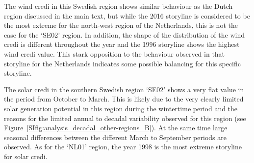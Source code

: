 \documentclass[a4paper,11pt]{extarticle}
\newcommand{\sdi}[0]{{\sc solar credi}}
\newcommand{\wdi}[0]{{\sc wind credi}}
\begin{document}
The \wdi{} in this Swedish region shows similar behaviour as the Dutch region discussed in the main text, but while the 2016 storyline is considered to be the most extreme for the north-west region of the Netherlands, this is not the case for the `SE02' region. 
In addition, the shape of the distribution of the \wdi{} is different throughout the year and the 1996 storyline shows the highest \wdi{} value. 
This stark opposition to the behaviour observed in that storyline for the Netherlands indicates some possible balancing for this specific storyline.

The \sdi{} in the southern Swedish region `SE02' shows a very flat value in the period from October to March. 
This is likely due to the very clearly limited solar generation potential in this region during the wintertime period and the reasons for the limited annual to decadal variability observed for this region (see Figure~\ref{SIfig:analysis_decadal_other-regions_B}). 
At the same time large seasonal differences between the different March to September periods are observed. 
As for the `NL01' region, the year 1998 is the most extreme storyline for \sdi.
\end{document}
